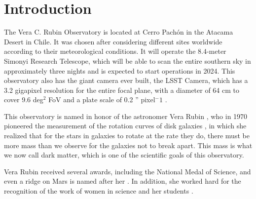 \section{Introduction} \label{sec:intro}


The Vera C. Rubin Observatory is located at Cerro Pachón in the Atacama Desert in Chile. It was chosen after considering different sites worldwide according to their meteorological conditions. It will operate the 8.4-meter Simonyi Research Telescope, which will be able to scan the entire southern sky in approximately three nights and is expected to start operations in 2024. This observatory also has the giant camera ever built, the LSST Camera, which has a 3.2 gigapixel resolution for the entire focal plane, with a diameter of 64 cm to cover 9.6 deg$^2$ FoV and a plate scale of 0.2 '' pixel$^-1$ \citep{2009arXiv0912.0201L}.

\vspace{3mm}

This observatory is named in honor of the astronomer Vera Rubin  \citep{NSF_2020}, who in 1970 pioneered the measurement of the rotation curves of disk galaxies \citep{rubin2011interesting}, in which she realized that for the stars in galaxies to rotate at the rate they do, there must be more mass than we observe for the galaxies not to break apart. This mass is what we now call dark matter, which is one of the scientific goals of this observatory. 

\vspace{3mm}

Vera Rubin received several awards, including the National Medal of Science, and even a ridge on Mars is named after her \citep{koren_2020}. In addition, she worked hard for the recognition of the work of women in science and her students \citep{rubin2011interesting}. 


